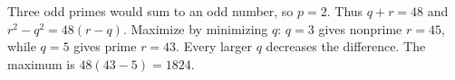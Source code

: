 Three odd primes would sum to an odd number, so $p=2$. Thus $q+r=48$ and $r^2-q^2=48(r-q)$. Maximize by minimizing $q$: $q=3$ gives nonprime $r=45$, while $q=5$ gives prime $r=43$. Every larger $q$ decreases the difference. The maximum is $48(43-5)=\boxed{1824}$.
